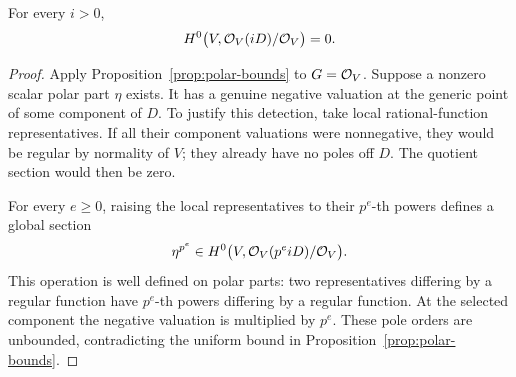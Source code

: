 \begin{corollary}
\label{cor:no-scalar-poles}
For every $i>0$,
\[
  H^0\bigl(V,\mathcal O_V(iD)/\mathcal O_V\bigr)=0.
\]
\end{corollary}

\begin{proof}
Apply Proposition~\ref{prop:polar-bounds} to $G=\mathcal O_V$.  Suppose a
nonzero scalar polar part $\eta$ exists.  It has a genuine negative
valuation at the generic point of some component of $D$.  To justify
this detection, take local rational-function representatives.  If all
their component valuations were nonnegative, they would be regular by
normality of $V$; they already have no poles off $D$.  The quotient
section would then be zero.

For every $e\ge0$, raising the local representatives to their $p^e$-th
powers defines a global section
\[
  \eta^{p^e}\in
  H^0\bigl(V,\mathcal O_V(p^eiD)/\mathcal O_V\bigr).
\]
This operation is well defined on polar parts: two representatives
differing by a regular function have $p^e$-th powers differing by a
regular function.  At the selected component the negative valuation is
multiplied by $p^e$.  These pole orders are unbounded, contradicting the
uniform bound in Proposition~\ref{prop:polar-bounds}.
\end{proof}

